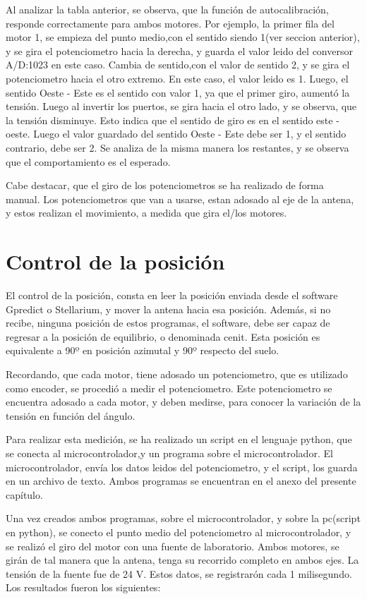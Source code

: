 Al analizar la tabla anterior, se observa, que la función de autocalibración, responde correctamente para ambos motores. Por ejemplo, la primer fila del motor 1, se empieza del punto medio,con el sentido siendo 1(ver seccion anterior), y se gira el potenciometro hacia la derecha, y guarda el valor leido del conversor A/D:1023 en este caso. Cambia de sentido,con el valor de sentido 2, y se gira el potenciometro hacia el otro extremo. En este caso, el valor leido es 1. Luego, el sentido Oeste - Este es el sentido con valor 1, ya que el primer giro, aumentó la tensión. Luego al invertir los puertos, se gira hacia el otro lado, y se observa, que la tensión disminuye. Esto indica que el sentido de giro es en el sentido este - oeste. Luego el valor guardado del sentido Oeste - Este debe ser 1, y el sentido contrario, debe ser 2. Se analiza de la misma manera los restantes, y se observa que el comportamiento es el esperado. 

Cabe destacar, que el giro de los potenciometros se ha realizado de forma manual. Los potenciometros que van a usarse, estan adosado al eje de la antena, y estos realizan el movimiento, a medida que gira el/los motores.  

\section{Control de la posición}
El control de la posición, consta en leer la posición enviada desde el software Gpredict o Stellarium, y mover la antena hacia esa posición. Además, si no recibe, ninguna posición de estos programas, el software, debe ser capaz de regresar a la posición de equilibrio, o denominada cenit. Esta posición es equivalente a 90º en posición azimutal y 90º respecto del suelo. 

Recordando, que cada motor, tiene adosado un potenciometro, que es utilizado como encoder, se procedió a medir el potenciometro. Este potenciometro se encuentra adosado a cada motor, y deben medirse, para conocer la variación de la tensión en función del ángulo. 

Para realizar esta medición, se ha realizado un script en el lenguaje python, que se conecta al microcontrolador,y un programa sobre el microcontrolador. El microcontrolador, envía los datos leidos del potenciometro, y el script, los guarda en un archivo de texto. Ambos programas se encuentran en el anexo del presente capítulo.

Una vez creados ambos programas, sobre el microcontrolador, y sobre la pc(script en python), se conecto el punto medio del potenciometro al microcontrolador, y se realizó el giro del motor con una fuente de laboratorio. Ambos motores, se girán de tal manera que la antena, tenga su recorrido completo en ambos ejes. La tensión de la fuente fue de 24 V. Estos datos, se registrarón cada 1 milisegundo. Los resultados fueron los siguientes: 


